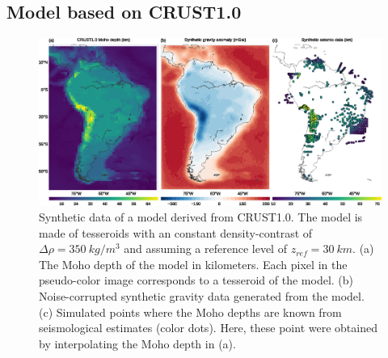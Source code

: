 




\subsection{Model based on CRUST1.0}\label{sec:crust1}

\begin{figure}
    \centering
    \includegraphics[width=\textwidth]{figures/paper-moho/synthetic-crust1-data}
    \caption{
        Synthetic data of a model derived from CRUST1.0.
        The model is made of tesseroids with an constant density-contrast
        of $\Delta\rho = 350\ kg/m^3$ and assuming a reference level of
        $z_{ref} = 30\ km$.
        (a) The Moho depth of the model in kilometers.
        Each pixel in the pseudo-color image corresponds to a tesseroid of the
        model.
        (b) Noise-corrupted synthetic gravity data generated from the model.
        (c) Simulated points where the Moho depths are known from seismological
        estimates (color dots).  Here, these point were obtained by
        interpolating the Moho depth in (a).
    }
    \label{fig:moho-crust1-data}
\end{figure}

